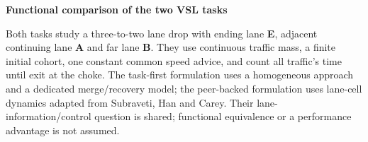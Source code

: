 \documentclass[10pt,a4paper]{article}
\begin{document}
\begin{center}
{\Large\bfseries Functional comparison of the two VSL tasks}
\end{center}
\vspace{-4pt}
\raggedright

Both tasks study a three-to-two lane drop with ending lane \textbf{E},
adjacent continuing lane \textbf{A} and far lane \textbf{B}. They use continuous
traffic mass, a finite initial cohort, one constant common speed advice,
and count all traffic's time until exit at the choke. The task-first
formulation uses a homogeneous approach and a dedicated merge/recovery
model; the peer-backed formulation uses lane-cell dynamics adapted from
Subraveti, Han and Carey. Their lane-information/control question is shared;
functional equivalence or a performance advantage is not assumed.
\end{document}
